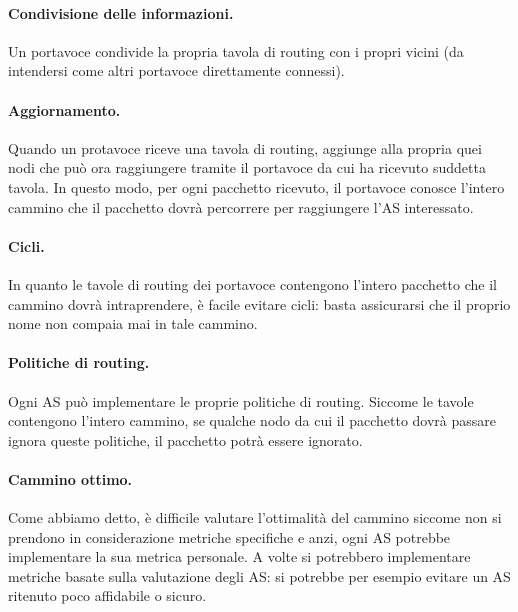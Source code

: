             \paragraph{Condivisione delle informazioni.} Un portavoce condivide la propria tavola di routing con i propri vicini (da intendersi come altri portavoce direttamente connessi).
            
            \paragraph{Aggiornamento.} Quando un protavoce riceve una tavola di routing, aggiunge alla propria quei nodi che può ora raggiungere tramite il portavoce da cui ha ricevuto suddetta tavola. In questo modo, per ogni pacchetto ricevuto, il portavoce conosce l'intero cammino che il pacchetto dovrà percorrere per raggiungere l'AS interessato.
            
            \paragraph{Cicli.} In quanto le tavole di routing dei portavoce contengono l'intero pacchetto che il cammino dovrà intraprendere, è facile evitare cicli: basta assicurarsi che il proprio nome non compaia mai in tale cammino.
            
            \paragraph{Politiche di routing.} Ogni AS può implementare le proprie politiche di routing. Siccome le tavole contengono l'intero cammino, se qualche nodo da cui il pacchetto dovrà passare ignora queste politiche, il pacchetto potrà essere ignorato.
            
            \paragraph{Cammino ottimo.} Come abbiamo detto, è difficile valutare l'ottimalità del cammino siccome non si prendono in considerazione metriche specifiche e anzi, ogni AS potrebbe implementare la sua metrica personale. A volte si potrebbero implementare metriche basate sulla valutazione degli AS: si potrebbe per esempio evitare un AS ritenuto poco affidabile o sicuro.